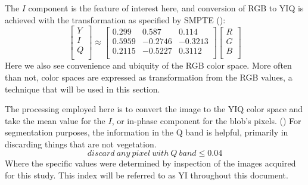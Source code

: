 \documentclass[letterpaper, notitlepage]{report}
\begin{document}
{The $I$ component is the feature of interest here, and conversion of RGB to YIQ is achieved with the transformation as specified by SMPTE (\citeyear{SMPTE2005-xl}):
\begin{equation}
	\begin{bmatrix}
	Y \\[0.3em]
	I \\[0.3em]
	Q \\[0.3em]
	\end{bmatrix}
	\approx
	\begin{bmatrix}
	0.299 & 0.587 & 0.114 \\[0.3em]
	0.5959 & -0.2746 & -0.3213\\[0.3em]
	0.2115 & -0.5227 & 0.3112 \\[0.3em]
	\end{bmatrix}
	\begin{bmatrix}
	R \\[0.3em]
	G \\[0.3em]
	B \\[0.3em]
	\end{bmatrix}	
\end{equation}
Here we also see convenience and ubiquity of the RGB color space. More often than not, color spaces are expressed as transformation from the RGB values, a technique that will be used in this section.



The processing employed here is to convert the image to the YIQ color space and take the mean value for the $I$, or in-phase component for the blob's pixels. (\cite{MathWorks2023-xp}) For segmentation purposes, the information in the Q band is helpful, primarily in discarding things that are not vegetation.
\begin{equation}\label{eqn:yiq-index}
	discard\ any\ pixel\ with\ Q\ band\leq 0.04
\end{equation}
Where the specific values were determined by inspection of the images acquired for this study. This index will be referred to as YI throughout this document.

}
\end{document}

